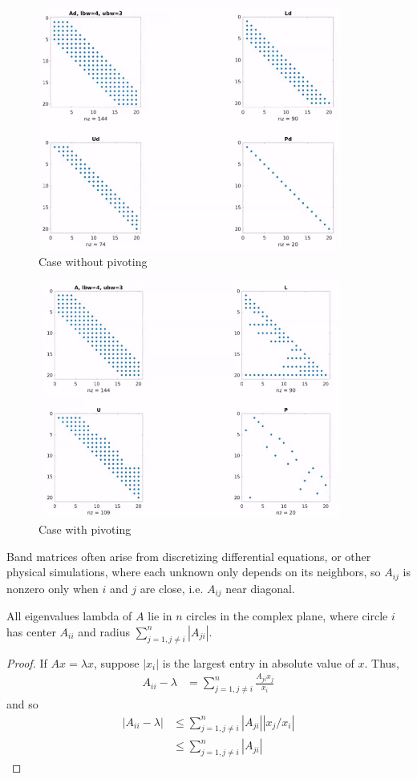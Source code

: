 \documentclass[11pt]{article}
\numberwithin{equation}{section}
\begin{document}
\begin{figure}
    \centering
    \includegraphics[width = 10cm]{images/lec6-2.png}
    \caption{Case without pivoting}
\end{figure}

\begin{figure}
    \centering
    \includegraphics[width = 10cm]{images/lec6-3.png}
    \caption{Case with pivoting}
\end{figure}

Band matrices often arise from discretizing differential equations, or other physical simulations, where each unknown only depends on its neighbors, 
so $A_{ij}$ is nonzero only when $i$ and $j$ are close, i.e. $A_{ij}$ near diagonal.

\begin{theorem}\label{thm:Gershgorin}
    All eigenvalues lambda of $A$ lie in $n$ circles in the complex plane, where circle $i$ has center $A_{ii}$ and radius $\sum_{j=1, j \neq i}^{n} |A_{ji}|$.
    \begin{proof}
        If $A x=\lambda x$, suppose $|x_i|$ is the largest entry in absolute value of $x$. Thus, \begin{align*}
            A_{ii}-\lambda &= \sum_{j=1, j \neq i}^{n} \frac{A_{ji} x_j}{x_i}
        \end{align*}
        and so \begin{align*}
            |A_{ii}-\lambda| &\leq \sum_{j=1, j \neq i}^{n} |A_{ji}| |{ x_j}/{x_i}| \\
            &\leq \sum_{j=1, j \neq i}^{n} |A_{ji}|
        \end{align*}
    \end{proof}
\end{theorem}
\end{document}
